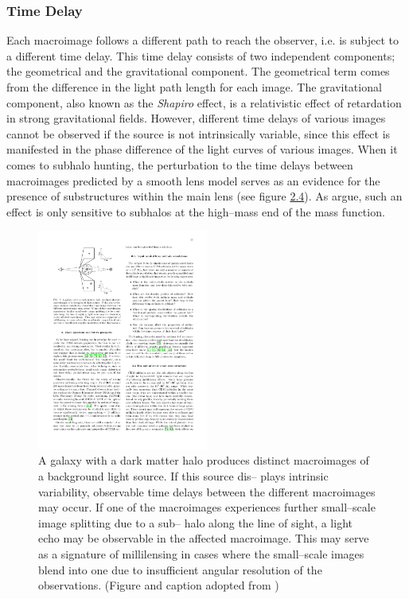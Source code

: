 \documentclass[paper=a4, fontsize=11pt]{scrartcl} %
\numberwithin{equation}{section} %
\numberwithin{figure}{section} %
\numberwithin{table}{section} %
\begin{document}
 \subsubsection{Time Delay}
 Each macroimage follows a different path to reach the observer, i.e. is subject to a different time delay. This time delay consists of two independent components; the geometrical and the gravitational component. The geometrical term comes from the difference in the light path length for each image. The gravitational component, also known as the \emph{Shapiro} effect, is a relativistic effect of retardation in strong gravitational fields. However, different time delays of various images cannot be observed if the source is not intrinsically variable, since this effect is manifested in the phase difference of the light curves of various images. When it comes to subhalo hunting, the perturbation to the time delays between macroimages predicted by a smooth lens model serves as an evidence for the presence of substructures within the main lens (see figure \hyperref[fig:time_delay]{2.4}). As \citet{Moustakas+2009} argue, such an effect is only sensitive to subhalos at the high--mass end of the mass function.
 
 \begin{figure}[h]
 \label{fig:time_delay}
 \centering
 \includegraphics[width=0.5\textwidth]{figs/time_delay}
 \caption{A galaxy with a dark matter halo produces distinct macroimages of a background light source. If this source dis-- plays intrinsic variability, observable time delays between the different macroimages may occur. If one of the macroimages experiences further small--scale image splitting due to a sub-- halo along the line of sight, a light echo may be observable in the affected macroimage. This may serve as a signature of millilensing in cases where the small--scale images blend into one due to insufficient angular resolution of the observations. (Figure and caption adopted from \cite{zackrisson09})}
 \end{figure}
 
\end{document}
